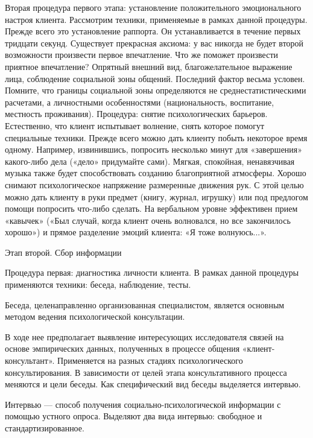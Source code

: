 \documentclass[a4paper, 12pt]{report}
\begin{document}
    Вторая процедура первого этапа: установление положительного 
    эмоционального настроя клиента. Рассмотрим техники, применяемые в 
    рамках данной процедуры. Прежде всего это установление раппорта. 
    Он устанавливается в течение первых тридцати секунд. Существует 
    прекрасная аксиома: у вас никогда не будет второй возможности 
    произвести первое впечатление. Что же поможет произвести приятное 
    впечатление? Опрятный внешний вид, благожелательное выражение лица, 
    соблюдение социальной зоны общений. Последний фактор весьма условен. 
    Помните, что границы социальной зоны определяются не 
    среднестатистическими расчетами, а личностными особенностями 
    (национальность, воспитание, местность проживания). Процедура: 
    снятие психологических барьеров. Естественно, что клиент испытывает 
    волнение, снять которое помогут специальные техники. 
    Прежде всего можно дать клиенту побыть некоторое время одному. 
    Например, извинившись, попросить несколько минут для «завершения» 
    какого-либо дела («дело» придумайте сами). Мягкая, спокойная, 
    ненавязчивая музыка также будет способствовать созданию благоприятной 
    атмосферы. Хорошо снимают психологическое напряжение размеренные 
    движения рук. С этой целью можно дать клиенту в руки предмет (книгу, 
    журнал, игрушку) или под предлогом помощи попросить что-либо сделать. 
    На вербальном уровне эффективен прием «кавычек» («Был случай, когда 
    клиент очень волновался, но все закончилось хорошо») и прямое 
    разделение эмоций клиента: «Я тоже волнуюсь...».
    
    Этап второй. Сбор информации
    
    Процедура первая: диагностика личности клиента. В рамках данной 
    процедуры применяются техники: беседа, наблюдение, тесты.
    
    Беседа, целенаправленно организованная специалистом, является 
    основным методом ведения психологической консультации.
  
    В ходе нее предполагает выявление интересующих исследователя связей 
    на основе эмпирических данных, полученных в процессе общения 
    «клиент-консультант». Применяется на разных стадиях психологического 
    консультирования. В зависимости от целей этапа консультативного 
    процесса меняются и цели беседы. Как специфический вид беседы 
    выделяется интервью.
    
    Интервью — способ получения социально-психологической информации с 
    помощью устного опроса. Выделяют два вида интервью: свободное и 
    стандартизированное.
    
\end{document}
